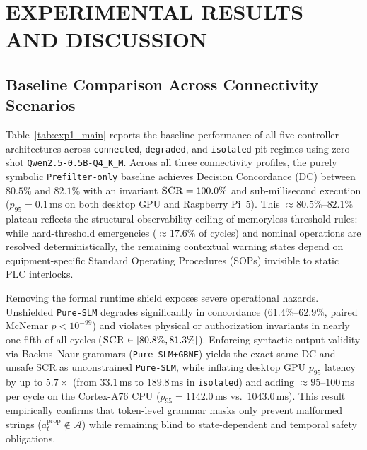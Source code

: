\documentclass{ieeeaccess}
\begin{document}
\section{EXPERIMENTAL RESULTS AND DISCUSSION}
\label{sec:results}

\subsection{Baseline Comparison Across Connectivity Scenarios}
Table~\ref{tab:exp1_main} reports the baseline performance of all five controller architectures across \texttt{connected}, \texttt{degraded}, and \texttt{isolated} pit regimes using zero-shot \texttt{Qwen2.5-0.5B-Q4\_K\_M}. Across all three connectivity profiles, the purely symbolic \texttt{Prefilter-only} baseline achieves Decision Concordance (\textsc{DC}) between $80.5\%$ and $82.1\%$ with an invariant $\textsc{SCR} = 100.0\%$ and sub-millisecond execution ($p_{95} = 0.1\,\text{ms}$ on both desktop GPU and Raspberry Pi~5). This $\approx 80.5\%$--$82.1\%$ plateau reflects the structural observability ceiling of memoryless threshold rules: while hard-threshold emergencies ($\approx 17.6\%$ of cycles) and nominal operations are resolved deterministically, the remaining contextual warning states depend on equipment-specific Standard Operating Procedures (SOPs) invisible to static PLC interlocks.



Removing the formal runtime shield exposes severe operational hazards. Unshielded \texttt{Pure-SLM} degrades significantly in concordance ($61.4\%$--$62.9\%$, paired McNemar $p < 10^{-99}$) and violates physical or authorization invariants in nearly one-fifth of all cycles ($\textsc{SCR} \in [80.8\%, 81.3\%]$). Enforcing syntactic output validity via Backus--Naur grammars (\texttt{Pure-SLM+GBNF}) yields the exact same \textsc{DC} and unsafe \textsc{SCR} as unconstrained \texttt{Pure-SLM}, while inflating desktop GPU $p_{95}$ latency by up to $5.7\times$ (from $33.1\,\text{ms}$ to $189.8\,\text{ms}$ in \texttt{isolated}) and adding $\approx 95$--$100\,\text{ms}$ per cycle on the Cortex-A76 CPU ($p_{95} = 1142.0\,\text{ms}$ vs.\ $1043.0\,\text{ms}$). This result empirically confirms that token-level grammar masks only prevent malformed strings ($a_t^{\mathrm{prop}} \notin \mathcal{A}$) while remaining blind to state-dependent and temporal safety obligations.
\end{document}
